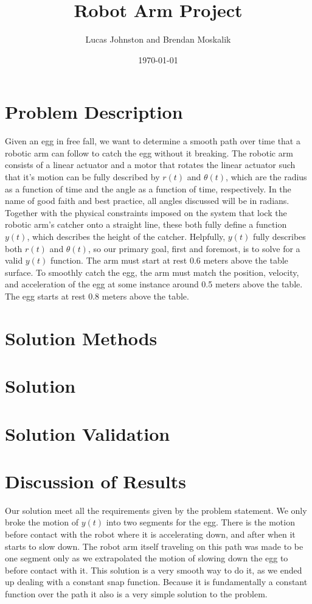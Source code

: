 \documentclass{article}
\title{Robot Arm Project}
\author{Lucas Johnston and Brendan Moskalik}
\date{\today}
\begin{document}
    \maketitle

    \section*{Problem Description}
    
    \tab Given an egg in free fall, we want to determine a smooth path over time that a robotic arm can follow to catch the egg without it breaking. The robotic arm consists of a linear actuator and a motor that rotates the linear actuator such that it's motion can be fully described by $r\left(t\right)$ and $\theta\left(t\right)$, which are the radius as a function of time and the angle as a function of time, respectively. In the name of good faith and best practice, all angles discussed will be in radians. Together with the physical constraints imposed on the system that lock the robotic arm's catcher onto a straight line, these both fully define a function $y\left(t\right)$, which describes the height of the catcher. Helpfully, $y\left(t\right)$ fully describes both $r\left(t\right)$ and $\theta\left(t\right)$, so our primary goal, first and foremost, is to solve for a valid $y\left(t\right)$ function. The arm must start at rest 0.6 meters above the table surface. To smoothly catch the egg, the arm must match the position, velocity, and acceleration of the egg at some instance around 0.5 meters above the table. The egg starts at rest 0.8 meters above the table.
     
	\section*{Solution Methods}
	
	\section*{Solution}
	
	\section*{Solution Validation}
	
	\section*{Discussion of Results}
	
	\tab Our solution meet all the requirements given by the problem statement. We only broke the motion of $y\left(t\right)$ into two segments for the egg. There is the motion before contact with the robot where it is accelerating down, and after when it starts to slow down. The robot arm itself traveling on this path was made to be one segment only as we extrapolated the motion of slowing down the egg to before contact with it. This solution is a very smooth way to do it, as we ended up dealing with a constant snap function. Because it is fundamentally a constant function over the path it also is a very simple solution to the problem.
	
\end{document}
